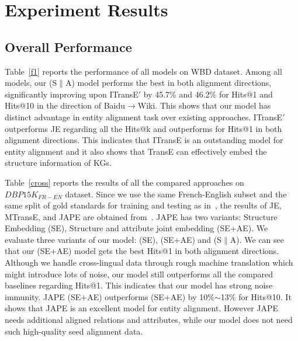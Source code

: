 


\section{Experiment Results\label{sec:results}}


\subsection{Overall Performance\label{overall}}
Table~\ref{f1} reports the performance of all models on WBD dataset. 
Among all models, %
our \HRGCN (S$\|$A) model performs the best in both alignment directions, significantly improving upon ITransE$'$ by 45.7\% and 46.2\% for Hits@1 and Hits@10 in the direction of Baidu$\rightarrow$Wiki. This shows that our model has distinct advantage in entity alignment task over existing approaches. 
ITransE$'$ outperforms JE regarding all the Hits@k and outperforms \GCN for Hits@1 in both alignment directions. This indicates that ITransE is an outstanding model for entity alignment and it also shows that TransE can effectively embed the structure information of KGs.




Table~\ref{cross} reports the results of all the compared approaches on $DBP15K_{FR-EN}$ dataset. Since we use the same French-English subset and the same split of gold standards for training and testing as in~\cite{sun2017cross}, the results of JE, MTransE, and JAPE are obtained from~\cite{sun2017cross}. JAPE has two variants: Structure Embedding (SE), Structure and attribute joint embedding (SE+AE). We evaluate three variants of our model: \HRGCN (SE), \HRGCN (SE+AE) and \HRGCN (S$\|$A). We can see that our \HRGCN (SE+AE) model gets the best Hits@1 in both alignment directions. Although we handle cross-lingual data through rough machine translation which might introduce lots of noise, our model still outperforms all the compared baselines regarding Hits@1. This indicates that our model has strong noise immunity. JAPE (SE+AE) outperforms \HRGCN (SE+AE) by 10\%$\sim$13\% for Hits@10. It shows that JAPE is an
excellent model for entity alignment. However JAPE needs additional aligned relations and attributes, while our model does not need such high-quality seed alignment data.

